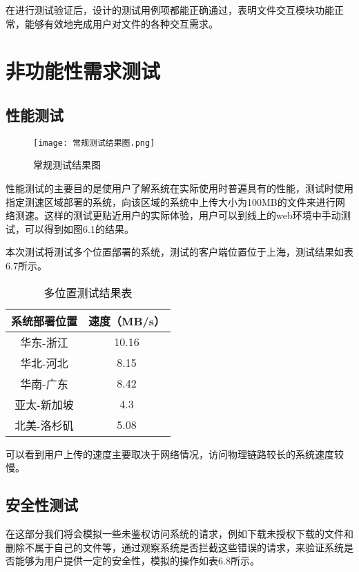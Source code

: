 在进行测试验证后，设计的测试用例项都能正确通过，表明文件交互模块功能正常，能够有效地完成用户对文件的各种交互需求。

\section{非功能性需求测试}%

\subsection{性能测试}%

\begin{figure}
  \centering
  \texttt{[image: 常规测试结果图.png]}
  \caption{常规测试结果图}
\end{figure}

性能测试的主要目的是使用户了解系统在实际使用时普遍具有的性能，测试时使用指定测速区域部署的系统，向该区域的系统中上传大小为100MB的文件来进行网络测速。这样的测试更贴近用户的实际体验，用户可以到线上的web环境中手动测试，可以得到如图6.1的结果。

本次测试将测试多个位置部署的系统，测试的客户端位置位于上海，测试结果如表6.7所示。

\begin{table}[h]
    \centering
    \vspace{10pt}
    \caption{多位置测试结果表}
    \vspace{-15pt}
    \begin{tabular}{cc}
      \toprule
      系统部署位置   & 速度（MB/s）   \\
      \midrule
      华东-浙江     & 10.16  \\
      华北-河北     & 8.15   \\
      华南-广东     & 8.42  \\
      亚太-新加坡   & 4.3   \\
      北美-洛杉矶   & 5.08  \\
      \bottomrule
    \end{tabular}
\end{table}

可以看到用户上传的速度主要取决于网络情况，访问物理链路较长的系统速度较慢。

\subsection{安全性测试}%

在这部分我们将会模拟一些未鉴权访问系统的请求，例如下载未授权下载的文件和删除不属于自己的文件等，通过观察系统是否拦截这些错误的请求，来验证系统是否能够为用户提供一定的安全性，模拟的操作如表6.8所示。

